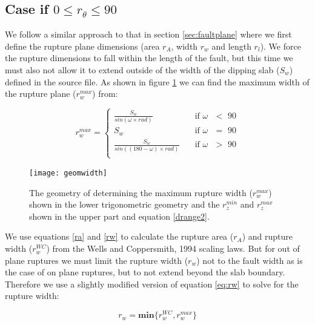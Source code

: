 \subsection{Case if  $0 \leq r_\theta \leq 90$} \label{sec:0to90}

We follow a similar approach to that in section \ref{sec:faultplane} where we first define the rupture plane dimensions (area $r_A$, width $r_w$ and length $r_l$). We force the rupture dimensions to fall within the length of the fault, but this time we must also not allow it to extend outside of the width of the dipping slab ($S_w$) defined in the source file. As shown in figure \ref{fig:deltaeq} we can find the maximum width of the rupture plane ($r_w^{max}$) from:

\begin{equation}\label{rwmax}
r_w^{max} = 
\begin{cases}
 \frac{ S_w }{sin (\omega \times rad)}		& \quad \mbox{if $\omega$ $<$ 90} \\
S_w							& \quad \mbox{if $\omega$ $=$ 90} \\
 \frac{ S_w }{sin ((180 - \omega ) \times rad)}	& \quad \mbox{if $\omega$ $>$ 90} \\
\end{cases}
\end{equation}


\begin{figure}[htp]
\centerline{\texttt{[image: geomwidth]}}
\caption{The geometry of determining the maximum rupture width ($r_w^{max}$) shown in the lower trigonometric geometry and the $r_z^{min}$ and $r_z^{max}$ shown in the upper part and equation \ref{drange2}.}
\label{fig:deltaeq}
\end{figure}

We use equations \ref{ra} and \ref{rw} to calculate the rupture area ($r_A$) and rupture width ($r_w^{WC}$) from the Wells and Coppersmith, 1994 scaling laws. But for out of plane ruptures we must limit the rupture width ($r_w$) not to the fault width as is the case of on plane ruptures, but to not extend beyond the slab boundary. Therefore we use a slightly modified version of equation \ref{eq:rw} to solve for the rupture width:

\begin{equation} \label{rw090}
r_w = \mathbf{min}\{ r_w^{WC}, r_w^{max}\}
\end{equation}

